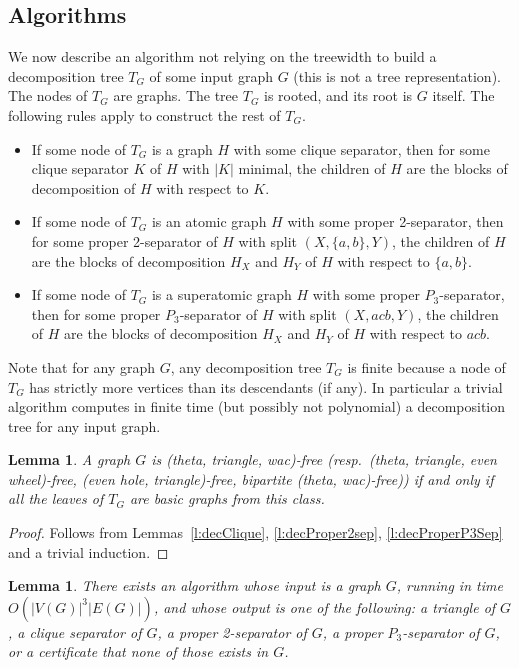 \documentclass[11pt]{article}
\newtheorem{lemma}[theo]{Lemma}
\begin{document}
\subsection{Algorithms}
\label{ssec:algo}


We now describe an algorithm not relying on the treewidth to build a decomposition tree $T_G$ of some input graph $G$ (this is not a tree representation). 
The nodes of $T_G$ are graphs.  The tree $T_G$ is rooted, and its root is $G$ itself. The following rules apply to construct the rest of $T_G$.

\begin{itemize}
    \item If some node of $T_G$ is a graph $H$ with some clique separator, then for some clique separator $K$ of $H$ with $|K|$ minimal, the children of $H$ are the blocks of decomposition of $H$ with respect to $K$.
    \item If some node of $T_G$ is an atomic graph $H$ with some proper 2-separator, then for some proper 2-separator of $H$ with split $(X, \{a, b\}, Y)$, the children of $H$ are the blocks of decomposition $H_X$ and $H_Y$ of $H$ with respect to $\{a, b\}$.
    \item If some node of $T_G$ is a superatomic graph $H$ with some proper $P_3$-separator, then for some proper $P_3$-separator of $H$ with split $(X, acb, Y)$, the children of $H$ are the blocks of decomposition $H_X$ and $H_Y$ of $H$ with respect to $acb$.
\end{itemize}

Note that for any graph $G$, any decomposition tree $T_G$ is finite because a node of $T_G$ has strictly more vertices than its descendants (if any). In particular a trivial algorithm computes in finite time (but possibly not polynomial) a decomposition tree for any input graph. 

\begin{lemma}
  \label{l:decLeaves}
  A graph $G$ is (theta, triangle, wac)-free (resp.\ (theta, triangle, even wheel)-free, (even hole, triangle)-free,  bipartite (theta, wac)-free)) if and only if all the leaves of $T_G$ are basic graphs from this class.
\end{lemma}

\begin{proof}
  Follows from Lemmas~\ref{l:decClique}, \ref{l:decProper2sep}, \ref{l:decProperP3Sep} and a trivial induction.
\end{proof}


\begin{lemma}
  \label{l:algDec}
  There exists an algorithm whose input is a graph $G$, running in time $O(|V(G)|^3|E(G)|)$, and whose output is one of the following: a triangle of $G$, a clique separator of $G$, a proper 2-separator of $G$, a proper $P_3$-separator of $G$, or a certificate that none of those exists in $G$.    
\end{lemma}
\end{document}
